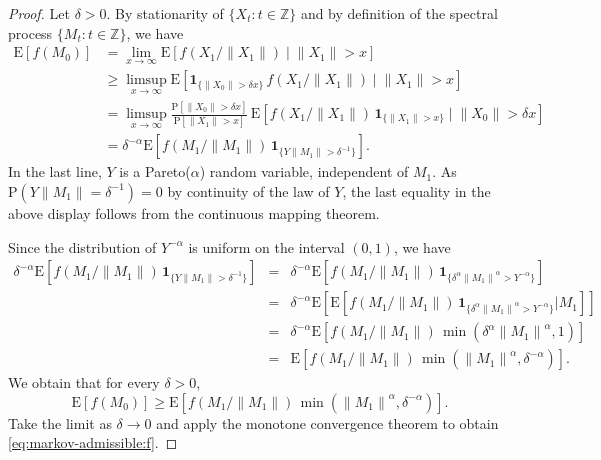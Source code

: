 \documentclass{aptpubarxiv}
\numberwithin{equation}{section}
\begin{document}
\begin{proof}
Let $\delta > 0$. By stationarity of $\{X_t:t \in {\mathbb{Z}}\}$ and by definition of the spectral process $\{M_t:t \in {\mathbb{Z}}\}$, we have
\begin{align*}
  {\mathrm{E}}[ f(M_0) ]
  &= \lim_{x \to \infty} {\mathrm{E}}[ f( X_1 / {\|{X_1}\|} ) \mid {\|{X_1}\|} > x ] \\
  &\ge \limsup_{x \to \infty} 
  {\mathrm{E}}[ {\boldsymbol{1}}_{ \{ {\|{X_0}\|} > \delta x \} } \, f( X_1 / {\|{X_1}\|} ) \mid {\|{X_1}\|} > x ] \\
  &= \limsup_{x \to \infty} 
  \frac{{\mathrm{P}}[ {\|{X_0}\|} > \delta x ]}{{\mathrm{P}}[ {\|{X_1}\|} > x]} \, {\mathrm{E}}[ f( X_1 / {\|{X_1}\|} ) \, {\boldsymbol{1}}_{ \{ {\|{X_1}\|} > x \} } \mid {\|{X_0}\|} > \delta x ] \\
  &= \delta^{-\alpha} {\mathrm{E}}[ f( M_1 / {\|{M_1}\|} ) \, {\boldsymbol{1}}_{ \{ Y {\|{M_1}\|} > \delta^{-1} \} } ].
\end{align*}
In the last line, $Y$ is a Pareto($\alpha$) random variable, independent of $M_1$. As ${\mathrm{P}}( Y {\|{M_1}\|} = \delta^{-1} ) = 0$ by continuity of the law of $Y$, the last equality in the above display follows from the continuous mapping theorem.

Since the distribution of $Y^{-\alpha}$ is uniform on the interval $(0, 1)$, we have
\begin{eqnarray*}
 \delta^{-\alpha} {\mathrm{E}}[ f( M_1 / {\|{M_1}\|} ) \, {\boldsymbol{1}}_{ \{ Y {\|{M_1}\|} > \delta^{-1} \} } ] &=& \delta^{-\alpha} {\mathrm{E}}[ f( M_1 / {\|{M_1}\|} ) \, {\boldsymbol{1}}_{ \{ \delta^\alpha {\|{M_1}\|}^\alpha > Y^{-\alpha} \} } ] \\
  &=& \delta^{-\alpha} {\mathrm{E}}[{\mathrm{E}}[ f( M_1 / {\|{M_1}\|} ) \, {\boldsymbol{1}}_{ \{ \delta^\alpha {\|{M_1}\|}^\alpha > Y^{-\alpha} \} }|M_1] ] \\
  &=& \delta^{-\alpha} {\mathrm{E}}[ f( M_1 / {\|{M_1}\|} ) \, \min( \delta^\alpha {\|{M_1}\|}^\alpha, 1 ) ] \\
  &=& {\mathrm{E}}[ f(M_1 / {\|{M_1}\|} ) \, \min( {\|{M_1}\|}^\alpha, \delta^{-\alpha} ) ].
\end{eqnarray*}
We obtain that for every $\delta > 0$,
\[
  {\mathrm{E}}[ f(M_0) ] \ge {\mathrm{E}}[ f(M_1 / {\|{M_1}\|} ) \, \min( {\|{M_1}\|}^\alpha, \delta^{-\alpha} ) ].
\]
Take the limit as $\delta \to 0$ and apply the monotone convergence theorem to obtain \eqref{eq:markov-admissible:f}. 


\end{proof}
\end{document}
